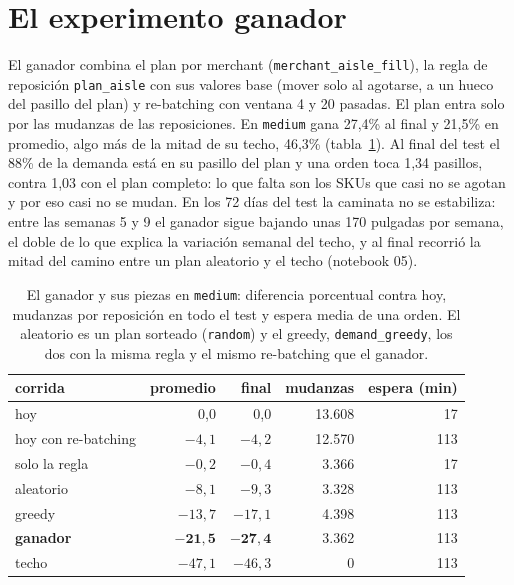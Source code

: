 \documentclass[11pt,a4paper,oneside]{report}
\newcommand{\code}[1]{\texttt{\small #1}}
\begin{document}
\section{El experimento ganador}

El ganador combina el plan por merchant (\code{merchant\_aisle\_fill}), la regla de reposición
\code{plan\_aisle} con sus valores base (mover solo al agotarse, a un hueco del pasillo del
plan) y re-batching con ventana 4 y 20 pasadas. El plan entra solo por las mudanzas de las
reposiciones. En \code{medium} gana 27,4\% al final y 21,5\% en promedio, algo más de la mitad
de su techo, 46,3\% (tabla~\ref{tab:ganador}). Al final del test el 88\% de la demanda está en
su pasillo del plan y una orden toca 1,34 pasillos, contra 1,03 con el plan completo: lo que
falta son los SKUs que casi no se agotan y por eso casi no se mudan. En los 72 días del test
la caminata no se estabiliza: entre las semanas 5 y 9 el ganador sigue bajando unas 170
pulgadas por semana, el doble de lo que explica la variación semanal del techo, y al final
recorrió la mitad del camino entre un plan aleatorio y el techo (notebook 05).

\begin{table}[ht]
\centering\small
\begin{tabular}{@{}lrrrr@{}}
\toprule
corrida & promedio & final & mudanzas & espera (min) \\
\midrule
hoy & 0,0 & 0,0 & 13.608 & 17 \\
hoy con re-batching & $-4{,}1$ & $-4{,}2$ & 12.570 & 113 \\
solo la regla & $-0{,}2$ & $-0{,}4$ & 3.366 & 17 \\
aleatorio & $-8{,}1$ & $-9{,}3$ & 3.328 & 113 \\
greedy & $-13{,}7$ & $-17{,}1$ & 4.398 & 113 \\
\textbf{ganador} & $\mathbf{-21{,}5}$ & $\mathbf{-27{,}4}$ & 3.362 & 113 \\
techo & $-47{,}1$ & $-46{,}3$ & 0 & 113 \\
\bottomrule
\end{tabular}
\caption{El ganador y sus piezas en \code{medium}: diferencia porcentual contra hoy, mudanzas
por reposición en todo el test y espera media de una orden. El aleatorio es un plan sorteado
(\code{random}) y el greedy, \code{demand\_greedy}, los dos con la misma regla y el mismo
re-batching que el ganador.}
\label{tab:ganador}
\end{table}
\end{document}
